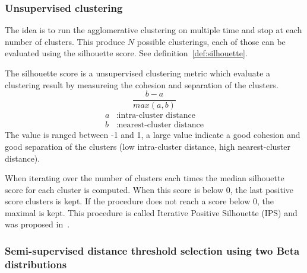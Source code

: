 \subsubsection{Unsupervised clustering}

The idea is to run the agglomerative clustering on multiple time and stop at each number of clusters.
This produce $N$ possible clusterings, each of those can be evaluated using the silhouette score.
See definition~\ref{def:silhouette}.

\begin{definition}
  \label{def:silhouette}
  The silhouette score is a unsupervised clustering metric which evaluate a clustering result by measureing the cohesion and separation of the clusters.
  \begin{equation}
    \frac{b - a}{max(a, b)}
  \end{equation}
  \begin{equation*}
    \begin{split}
      a&: \text{intra-cluster distance}\\
      b&: \text{nearest-cluster distance}
    \end{split}
  \end{equation*}
  The value is ranged between -1 and 1, a large value indicate a good cohesion and good separation of the clusters (low intra-cluster distance, high nearest-cluster distance).
\end{definition}

When iterating over the number of clusters each times the median silhouette score for each cluster is computed.
When this score is below 0, the last positive score clusters is kept.
If the procedure does not reach a score below 0, the maximal is kept.
This procedure is called Iterative Positive Silhouette (IPS) and was proposed in~\cite{automated_unsupervised}.

\subsubsection{Semi-supervised distance threshold selection using two Beta distributions}

